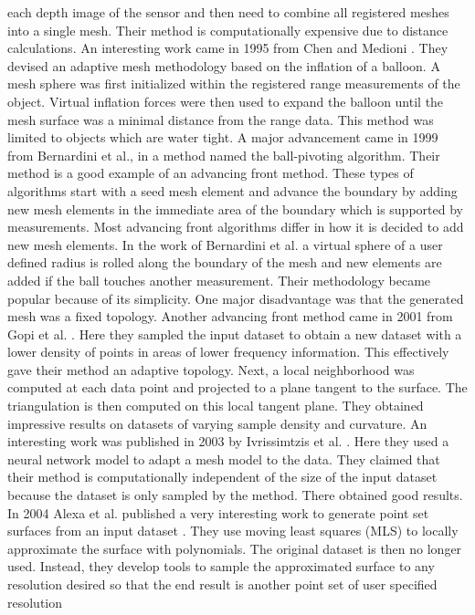 each depth image of the sensor and then need to combine all registered
meshes into a single mesh. Their method is computationally expensive due to
distance calculations. An interesting work came in 1995 from Chen and
Medioni \cite{Chen1995}. They devised an adaptive mesh methodology based
on the inflation of a balloon. A mesh sphere was first initialized within
the registered range measurements of the object. Virtual inflation forces
were then used to expand the balloon until the mesh surface was a minimal
distance from the range data. This method was limited to objects which are
water tight. A major advancement came in 1999 from Bernardini et al.,
\cite{Bernardini1999a} in a method named the ball-pivoting algorithm. Their
method is a good example of an advancing front method. These types of
algorithms start with a seed mesh element and advance the boundary by
adding new mesh elements in the immediate area of the boundary which is
supported by measurements. Most advancing front algorithms differ in how it
is decided to add new mesh elements. In the work of Bernardini et al. a
virtual sphere of a user defined radius is rolled along the boundary of the
mesh and new elements are added if the ball touches another measurement.
Their methodology became popular because of its simplicity. One major
disadvantage was that the generated mesh was a fixed topology. Another
advancing front method came in 2001 from Gopi et al.
\cite{Gopi2001,Gopi2002}. Here they sampled the input dataset to obtain a new
dataset with a lower density of points in areas of lower frequency
information. This effectively gave their method an adaptive topology. Next,
a local neighborhood was computed at each data point and projected to a
plane tangent to the surface. The triangulation is then computed on this
local tangent plane. They obtained impressive results on datasets of
varying sample density and curvature. An interesting work was published in
2003 by Ivrissimtzis et al. \cite{Ivrissimtzis2003}. Here they used a
neural network model to adapt a mesh model to the data. They claimed that
their method is computationally independent of the size of the input
dataset because the dataset is only sampled by the method. There obtained
good results. In 2004 Alexa et al. published a very interesting
work to generate point set surfaces from an input dataset \cite{Alexa2004}.
They use moving least squares (MLS) to locally approximate the surface with
polynomials. The original dataset is then no longer used. Instead, they
develop tools to sample the approximated surface to any resolution desired
so that the end result is another point set of user specified resolution
